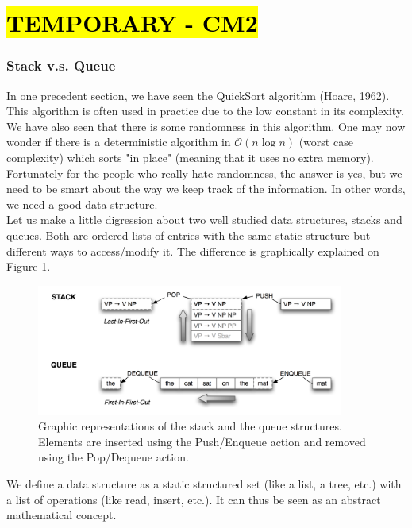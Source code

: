 \part*{\hl{TEMPORARY - CM2}}

\section{Stack v.s. Queue}

In one precedent section, we have seen the QuickSort algorithm (Hoare, 1962). This algorithm is often used in practice due to the low constant in its complexity. We have also seen that there is some randomness in this algorithm. One may now wonder if there is a deterministic algorithm in $\mathcal{O}(n\log n)$ (worst case complexity) which sorts "in place" (meaning that it uses no extra memory).\\ 

Fortunately for the people who really hate randomness, the answer is yes, but we need to be smart about the way we keep track of the information. In other words, we need a good data structure.\\

Let us make a little digression about two well studied data structures, stacks and queues. Both are ordered lists of entries with the same static structure but different ways to access/modify it. The difference is graphically explained on Figure \ref{stackandqueue}.

\begin{figure}[!h]
	\centering
 	\includegraphics[width=0.9\textwidth]{images/CM2/stack-queue.png}
  	\caption{Graphic representations of the stack and the queue structures. Elements are inserted using the Push/Enqueue action and removed using the Pop/Dequeue action.}
   	\label{stackandqueue}
\end{figure}

We define a data structure as a static structured set (like a list, a tree, etc.) with a list of operations (like read, insert, etc.). It can thus be seen as an abstract mathematical concept. 

